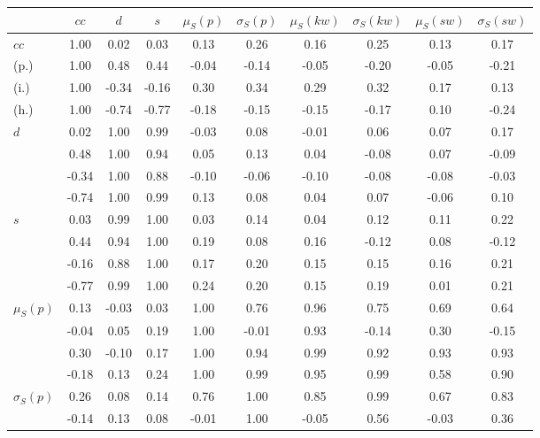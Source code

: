 \begin{table*}[h!]
\begin{center}
\begin{tabular}{| l | c | c | c | c | c | c | c | c | c |}\hline
 & $cc$ & $d$ & $s$ & $\mu_S(p)$ & $\sigma_S(p)$ & $\mu_S(kw)$ & $\sigma_S(kw)$ & $\mu_S(sw)$ & $\sigma_S(sw)$ \\\hline
$cc$ & 1.00  & 0.02  & 0.03  & 0.13  & 0.26  & 0.16  & 0.25  & 0.13  & 0.17 \\\hline
(p.) & 1.00  & 0.48  & 0.44  & -0.04  & -0.14  & -0.05  & -0.20  & -0.05  & -0.21 \\\hline
(i.) & 1.00  & -0.34  & -0.16  & 0.30  & 0.34  & 0.29  & 0.32  & 0.17  & 0.13 \\\hline
(h.) & 1.00  & -0.74  & -0.77  & -0.18  & -0.15  & -0.15  & -0.17  & 0.10  & -0.24 \\\hline
$d$ & 0.02  & 1.00  & 0.99  & -0.03  & 0.08  & -0.01  & 0.06  & 0.07  & 0.17 \\\hline
 & 0.48  & 1.00  & 0.94  & 0.05  & 0.13  & 0.04  & -0.08  & 0.07  & -0.09 \\\hline
 & -0.34  & 1.00  & 0.88  & -0.10  & -0.06  & -0.10  & -0.08  & -0.08  & -0.03 \\\hline
 & -0.74  & 1.00  & 0.99  & 0.13  & 0.08  & 0.04  & 0.07  & -0.06  & 0.10 \\\hline
$s$ & 0.03  & 0.99  & 1.00  & 0.03  & 0.14  & 0.04  & 0.12  & 0.11  & 0.22 \\\hline
 & 0.44  & 0.94  & 1.00  & 0.19  & 0.08  & 0.16  & -0.12  & 0.08  & -0.12 \\\hline
 & -0.16  & 0.88  & 1.00  & 0.17  & 0.20  & 0.15  & 0.15  & 0.16  & 0.21 \\\hline
 & -0.77  & 0.99  & 1.00  & 0.24  & 0.20  & 0.15  & 0.19  & 0.01  & 0.21 \\\hline
$\mu_S(p)$ & 0.13  & -0.03  & 0.03  & 1.00  & 0.76  & 0.96  & 0.75  & 0.69  & 0.64 \\\hline
 & -0.04  & 0.05  & 0.19  & 1.00  & -0.01  & 0.93  & -0.14  & 0.30  & -0.15 \\\hline
 & 0.30  & -0.10  & 0.17  & 1.00  & 0.94  & 0.99  & 0.92  & 0.93  & 0.93 \\\hline
 & -0.18  & 0.13  & 0.24  & 1.00  & 0.99  & 0.95  & 0.99  & 0.58  & 0.90 \\\hline
$\sigma_S(p)$ & 0.26  & 0.08  & 0.14  & 0.76  & 1.00  & 0.85  & 0.99  & 0.67  & 0.83 \\\hline
 & -0.14  & 0.13  & 0.08  & -0.01  & 1.00  & -0.05  & 0.56  & -0.03  & 0.36 \\\hline

\end{tabular}
\end{center}
\end{table*}

